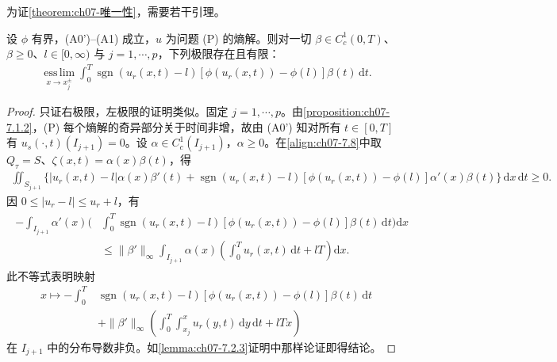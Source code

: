 \documentclass[../../main.tex]{subfiles}%
\begin{document}
为证\cref{theorem:ch07-唯一性}，需要若干引理。

\begin{lemma}\label{lemma:ch07-7.2.5}
设 $\phi$ 有界，(A0')--(A1) 成立，$u$ 为问题 (P) 的熵解。则对一切 $\beta\in C^1_c(0,T)$、$\beta\geqslant0$、$l\in[0,\infty)$ 与 $j=1,\cdots,p$，下列极限存在且有限：
\begin{align}
\operatorname*{ess\,lim}_{x\to x_j^\pm}\int_0^T\operatorname{sgn}(u_r(x,t)-l)[\phi(u_r(x,t))-\phi(l)]\beta(t)\,\mathrm{d}t. \label{align:ch07-7.23}
\end{align}
\end{lemma}

\begin{proof}
只证右极限，左极限的证明类似。固定 $j=1,\cdots,p$。由\cref{proposition:ch07-7.1.2}，(P) 每个熵解的奇异部分关于时间非增，故由 (A0') 知对所有 $t\in[0,T]$ 有 $u_s(\cdot,t)(I_{j+1})=0$。设 $\alpha\in C^1_c(I_{j+1})$，$\alpha\geqslant0$。在\eqref{align:ch07-7.8}中取 $Q_\tau=S$、$\zeta(x,t)=\alpha(x)\beta(t)$，得
\begin{align*}
\iint_{S_{j+1}}\{|u_r(x,t)-l|\alpha(x)\beta'(t)+\operatorname{sgn}(u_r(x,t)-l)[\phi(u_r(x,t))-\phi(l)]\alpha'(x)\beta(t)\}\,\mathrm{d}x\,\mathrm{d}t\geqslant0.
\end{align*}
因 $0\leqslant|u_r-l|\leqslant u_r+l$，有
\begin{align*}
\begin{aligned}
-\int_{I_{j+1}}\alpha'(x)\bigg(&\int_0^T\operatorname{sgn}(u_r(x,t)-l)[\phi(u_r(x,t))-\phi(l)]\beta(t)\,\mathrm{d}t\bigg)\mathrm{d}x\\
&\leqslant\|\beta'\|_\infty\int_{I_{j+1}}\alpha(x)\left(\int_0^T u_r(x,t)\,\mathrm{d}t+lT\right)\mathrm{d}x.
\end{aligned}
\end{align*}
此不等式表明映射
\begin{align*}
x\mapsto-\int_0^T&\operatorname{sgn}(u_r(x,t)-l)[\phi(u_r(x,t))-\phi(l)]\beta(t)\,\mathrm{d}t\\
&+\|\beta'\|_\infty\left(\int_0^T\int_{x_j}^x u_r(y,t)\,\mathrm{d}y\,\mathrm{d}t+lTx\right)
\end{align*}
在 $I_{j+1}$ 中的分布导数非负。如\cref{lemma:ch07-7.2.3}证明中那样论证即得结论。
\end{proof}
\end{document}
